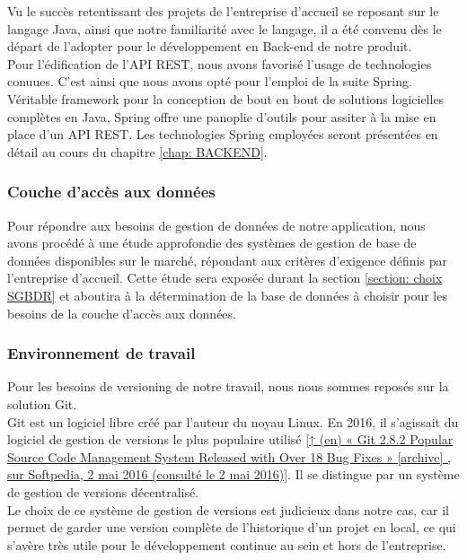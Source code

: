 \begin{spacing}{1.5}
Vu le succès retentissant des projets de l'entreprise d'accueil se reposant sur le langage Java, ainsi que notre familiarité avec le langage, il a été convenu dès le départ de l'adopter pour le développement en Back-end de notre produit.\\
Pour l'édification de l'API REST, nous avons favorisé l'usage de technologies conuues. C'est ainsi que nous avons opté pour l'emploi de la suite Spring. Véritable framework pour la conception de bout en bout de solutions logicielles complètes en Java, Spring offre une panoplie d'outils pour assiter à la mise en place d'un API REST. Les technologies Spring employées seront présentées en détail au cours du chapitre \ref{chap: BACKEND}.

\subsubsection*{Couche d'accès aux données}
Pour répondre aux besoins de gestion de données de notre application, nous avons procédé à une étude approfondie des systèmes de gestion de base de données disponibles sur le marché, répondant aux critères d'exigence définis par l'entreprise d'accueil. Cette étude sera exposée durant la section \ref{section: choix SGBDR} et aboutira à la détermination de la base de données à choisir pour les besoins de la couche d'accès aux données.

\subsubsection*{Environnement de travail}
Pour les besoins de versioning de notre travail, nous nous sommes reposés sur la solution Git.\\
Git est un logiciel libre créé par l'auteur du noyau Linux. En 2016, il s’agissait du logiciel de gestion de versions le plus populaire utilisé \ref{↑ (en) « Git 2.8.2 Popular Source Code Management System Released with Over 18 Bug Fixes » [archive] , sur Softpedia, 2 mai 2016 (consulté le 2 mai 2016)}. Il se distingue par un système de gestion de versions décentralisé.\\
Le choix de ce système de gestion de versions est judicieux dans notre cas, car il permet de garder une version complète de l'historique d'un projet en local, ce qui s'avère très utile pour le développement continue au sein et hors de l'entreprise.\\


\end{spacing}
